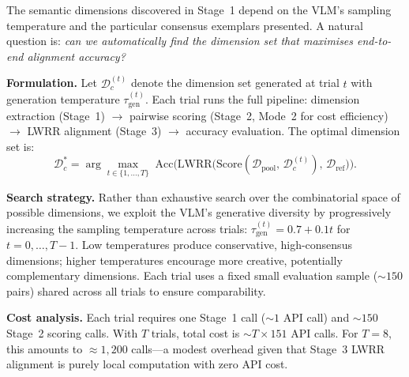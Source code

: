 \documentclass[runningheads]{llncs}
\begin{document}
The semantic dimensions discovered in Stage~1 depend on the VLM's sampling temperature and the particular consensus exemplars presented.
A natural question is: \emph{can we automatically find the dimension set that maximises end-to-end alignment accuracy?}

\smallskip\noindent\textbf{Formulation.}
Let $\mathcal{D}_c^{(t)}$ denote the dimension set generated at trial $t$ with generation temperature $\tau_{\mathrm{gen}}^{(t)}$.
Each trial runs the full pipeline: dimension extraction (Stage~1) $\to$ pairwise scoring (Stage~2, Mode~2 for cost efficiency) $\to$ LWRR alignment (Stage~3) $\to$ accuracy evaluation.
The optimal dimension set is:
\begin{equation}
\mathcal{D}_c^{*} = \arg\max_{t \in \{1,\ldots,T\}} \;\mathrm{Acc}\bigl(\text{LWRR}\bigl(\text{Score}(\mathcal{D}_{\mathrm{pool}},\, \mathcal{D}_c^{(t)}),\, \mathcal{D}_{\mathrm{ref}}\bigr)\bigr).
\label{eq:e2e_supp}
\end{equation}

\smallskip\noindent\textbf{Search strategy.}
Rather than exhaustive search over the combinatorial space of possible dimensions, we exploit the VLM's generative diversity by progressively increasing the sampling temperature across trials: $\tau_{\mathrm{gen}}^{(t)} = 0.7 + 0.1t$ for $t=0,\ldots,T{-}1$.
Low temperatures produce conservative, high-consensus dimensions; higher temperatures encourage more creative, potentially complementary dimensions.
Each trial uses a fixed small evaluation sample (${\sim}150$ pairs) shared across all trials to ensure comparability.

\smallskip\noindent\textbf{Cost analysis.}
Each trial requires one Stage~1 call (${\sim}1$ API call) and ${\sim}150$ Stage~2 scoring calls.
With $T$ trials, total cost is ${\sim}T \times 151$ API calls.
For $T{=}8$, this amounts to ${\approx}1{,}200$ calls---a modest overhead given that Stage~3 LWRR alignment is purely local computation with zero API cost.
\end{document}

